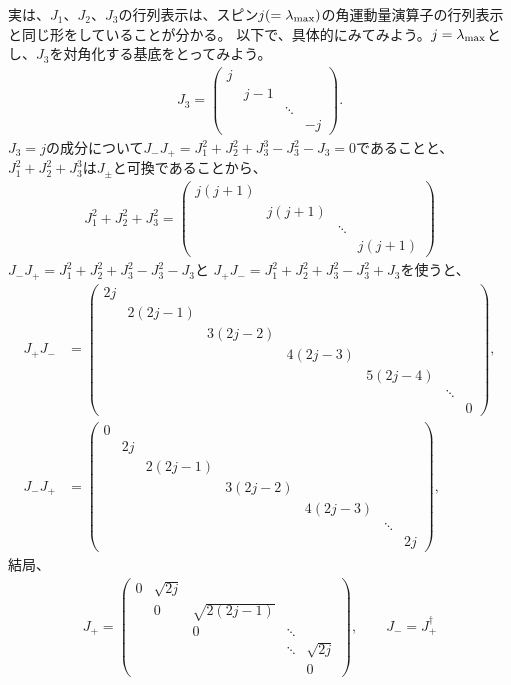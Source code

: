 \documentclass[10pt,a4paper]{jarticle}
\begin{document}
実は、$J_1$、$J_2$、$J_3$の行列表示は、スピン$j(=\lambda_{\rm max})$の角運動量演算子の行列表示と同じ形をしていることが分かる。
以下で、具体的にみてみよう。$j=\lambda_{\rm max}$とし、$J_3$を対角化する基底をとってみよう。
\begin{align}
J_3 = \left(\begin{array}{cccc}
j &&& \\
& j-1 && \\
&& \ddots & \\
&&& -j
\end{array}\right).
\end{align}
%
$J_3 = j$の成分について$J_- J_+ = J_1^2 + J_2^2 + J_3^3 - J_3^2 - J_3 = 0$であることと、
$J_1^2 + J_2^2 + J_3^3$は$J_\pm$と可換であることから、
\begin{align}
J_1^2+J_2^2+J_3^2 = \left(\begin{array}{cccc}
j(j+1) &&& \\
& j(j+1) && \\
&& \ddots & \\
&&& j(j+1)
\end{array}\right) \label{eq:J3 spin j}
\end{align}
%
$J_- J_+ = J_1^2 + J_2^2 + J_3^2 - J_3^2 - J_3$と
$J_+ J_- = J_1^2 + J_2^2 + J_3^2 - J_3^2 + J_3$を使うと、
\begin{align}
J_+ J_-
& = \left(\begin{array}{ccccccc}
 2j &&&&&& \\
& 2(2j-1) &&&&& \\
&& 3(2j-2) &&&& \\
&&& 4(2j-3) &&& \\
&&&& 5(2j-4) && \\
&&&&& \ddots & \\
&&&&&& 0
\end{array}\right), \\
%
J_- J_+
& = \left(\begin{array}{ccccccc}
0 &&&&&& \\
& 2j &&&&& \\
&& 2(2j-1) &&&& \\
&&& 3(2j-2) &&& \\
&&&& 4(2j-3) && \\
&&&&& \ddots & \\
&&&&&& 2j
\end{array}\right), \quad
\end{align}
%
結局、
\begin{align}
J_+ = \left(\begin{array}{ccccc}
0& \sqrt{2j} &&& \\
&0& \sqrt{2(2j-1)} && \\
&&0& \ddots & \\
&&&\ddots& \sqrt{2j} \\
&&&&0
\end{array}\right), \qquad
J_- = J_+^\dagger
\end{align}
\end{document}
